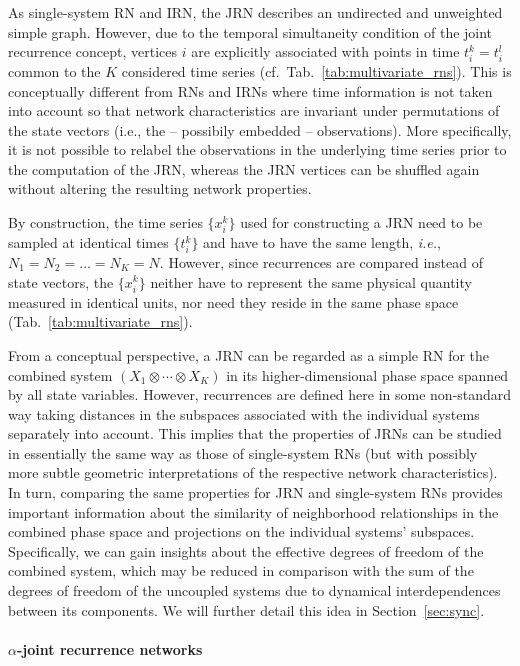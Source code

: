 As single-system RN and IRN, the JRN describes an undirected and unweighted simple graph. However, due to the temporal simultaneity condition of the joint recurrence concept, vertices $i$ are explicitly associated with points in time $t^k_i=t^l_i$ common to the $K$ considered time series (cf.~Tab.~\ref{tab:multivariate_rns}). This is conceptually different from RNs and IRNs where time information is not taken into account so that network characteristics are invariant under permutations of the state vectors (i.e., the -- possibily embedded -- observations). More specifically, it is not possible to relabel the observations in the underlying time series prior to the computation of the JRN, whereas the JRN vertices can be shuffled again without altering the resulting network properties. 

By construction, the time series $\{x_i^k\}$ used for constructing a JRN need to be sampled at identical times $\{t^k_i\}$ and have to have the same length, \textit{i.e.}, $N_1=N_2=\dots=N_K=N$. However, since recurrences are compared instead of state vectors, the $\{x_i^k\}$ neither have to represent the same physical quantity measured in identical units, nor need they reside in the same phase space (Tab.~\ref{tab:multivariate_rns}). 

From a conceptual perspective, a JRN can be regarded as a simple RN for the combined system $(X_1\otimes\cdots\otimes X_K)$ in its higher-dimensional phase space spanned by all state variables. However, recurrences are defined here in some non-standard way taking distances in the subspaces associated with the individual systems separately into account. This implies that the properties of JRNs can be studied in essentially the same way as those of single-system RNs (but with possibly more subtle geometric interpretations of the respective network characteristics). In turn, comparing the same properties for JRN and single-system RNs provides important information about the similarity of neighborhood relationships in the combined phase space and projections on the individual systems' subspaces. Specifically, we can gain insights about the effective degrees of freedom of the combined system, which may be reduced in comparison with the sum of the degrees of freedom of the uncoupled systems due to dynamical interdependences between its components. We will further detail this idea in Section~\ref{sec:sync}.


\paragraph{$\alpha$-joint recurrence networks}

